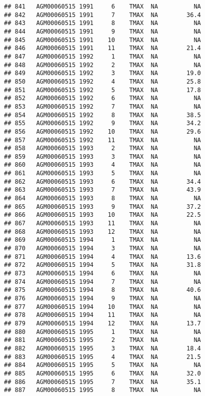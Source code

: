 \documentclass{article}\usepackage[]{graphicx}\usepackage[]{color}
\makeatletter
\newenvironment{kframe}{%
 \def\at@end@of@kframe{}%
 \ifinner\ifhmode%
  \def\at@end@of@kframe{\end{minipage}}%
  \begin{minipage}{\columnwidth}%
 \fi\fi%
 \def\FrameCommand##1{\hskip\@totalleftmargin \hskip-\fboxsep
 \colorbox{shadecolor}{##1}\hskip-\fboxsep
     \hskip-\linewidth \hskip-\@totalleftmargin \hskip\columnwidth}%
 \MakeFramed {\advance\hsize-\width
   \@totalleftmargin\z@ \linewidth\hsize
   \@setminipage}}%
 {\par\unskip\endMakeFramed%
 \at@end@of@kframe}
\newenvironment{knitrout}{}{} %
\makeatother
\begin{document}
\begin{knitrout}
\begin{kframe}
\begin{verbatim}
## 841   AGM00060515 1991     6    TMAX  NA          NA
## 842   AGM00060515 1991     7    TMAX  NA        36.4
## 843   AGM00060515 1991     8    TMAX  NA          NA
## 844   AGM00060515 1991     9    TMAX  NA          NA
## 845   AGM00060515 1991    10    TMAX  NA          NA
## 846   AGM00060515 1991    11    TMAX  NA        21.4
## 847   AGM00060515 1992     1    TMAX  NA          NA
## 848   AGM00060515 1992     2    TMAX  NA          NA
## 849   AGM00060515 1992     3    TMAX  NA        19.0
## 850   AGM00060515 1992     4    TMAX  NA        25.8
## 851   AGM00060515 1992     5    TMAX  NA        17.8
## 852   AGM00060515 1992     6    TMAX  NA          NA
## 853   AGM00060515 1992     7    TMAX  NA          NA
## 854   AGM00060515 1992     8    TMAX  NA        38.5
## 855   AGM00060515 1992     9    TMAX  NA        34.2
## 856   AGM00060515 1992    10    TMAX  NA        29.6
## 857   AGM00060515 1992    11    TMAX  NA          NA
## 858   AGM00060515 1993     2    TMAX  NA          NA
## 859   AGM00060515 1993     3    TMAX  NA          NA
## 860   AGM00060515 1993     4    TMAX  NA          NA
## 861   AGM00060515 1993     5    TMAX  NA          NA
## 862   AGM00060515 1993     6    TMAX  NA        34.4
## 863   AGM00060515 1993     7    TMAX  NA        43.9
## 864   AGM00060515 1993     8    TMAX  NA          NA
## 865   AGM00060515 1993     9    TMAX  NA        37.2
## 866   AGM00060515 1993    10    TMAX  NA        22.5
## 867   AGM00060515 1993    11    TMAX  NA          NA
## 868   AGM00060515 1993    12    TMAX  NA          NA
## 869   AGM00060515 1994     1    TMAX  NA          NA
## 870   AGM00060515 1994     3    TMAX  NA          NA
## 871   AGM00060515 1994     4    TMAX  NA        13.6
## 872   AGM00060515 1994     5    TMAX  NA        31.8
## 873   AGM00060515 1994     6    TMAX  NA          NA
## 874   AGM00060515 1994     7    TMAX  NA          NA
## 875   AGM00060515 1994     8    TMAX  NA        40.6
## 876   AGM00060515 1994     9    TMAX  NA          NA
## 877   AGM00060515 1994    10    TMAX  NA          NA
## 878   AGM00060515 1994    11    TMAX  NA          NA
## 879   AGM00060515 1994    12    TMAX  NA        13.7
## 880   AGM00060515 1995     1    TMAX  NA          NA
## 881   AGM00060515 1995     2    TMAX  NA          NA
## 882   AGM00060515 1995     3    TMAX  NA        18.4
## 883   AGM00060515 1995     4    TMAX  NA        21.5
## 884   AGM00060515 1995     5    TMAX  NA          NA
## 885   AGM00060515 1995     6    TMAX  NA        32.0
## 886   AGM00060515 1995     7    TMAX  NA        35.1
## 887   AGM00060515 1995     8    TMAX  NA          NA

\end{verbatim}
\end{kframe}
\end{knitrout}
\end{document}
